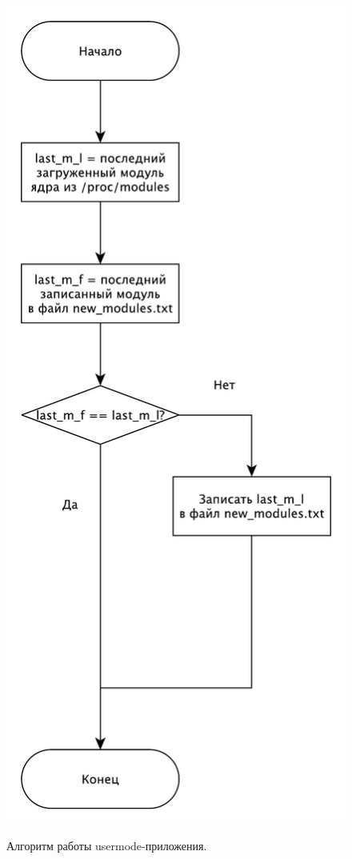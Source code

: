\documentclass[a4paper,14pt]{extarticle}
\begin{document}
 	\begin{figure}[h!]
 		\begin{center}
 			{\includegraphics[scale = 0.6]{img/theme_usermode.pdf}}
 			\label{ris:theme_usermode}
 		\end{center}
 		\caption{Алгоритм работы usermode-приложения.}
 	\end{figure}
 
\end{document}
